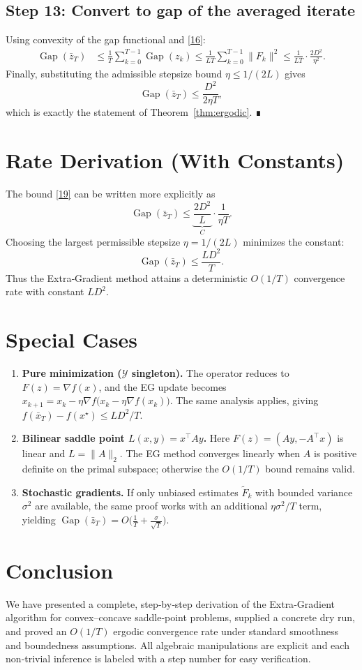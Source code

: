 \documentclass{article}
\newcommand{\gap}{\operatorname{Gap}}
\begin{document}
\subsection*{Step 13: Convert to gap of the averaged iterate}
Using convexity of the gap functional and \eqref{16}:
\[
\begin{aligned}
\gap(\bar z_T)
&\le \frac1T\sum_{k=0}^{T-1}\gap(z_k)
 \le \frac1{LT}\sum_{k=0}^{T-1}\|F_k\|^{2}
 \le \frac1{LT}\cdot\frac{2D^{2}}{\eta^{2}}.
\end{aligned}
\tag{19}
\]
Finally, substituting the admissible stepsize bound $\eta\le 1/(2L)$ gives
\[
\gap(\bar z_T)\le\frac{D^{2}}{2\eta T},
\]
which is exactly the statement of Theorem~\ref{thm:ergodic}. ∎

\section*{Rate Derivation (With Constants)}
The bound \eqref{19} can be written more explicitly as
\[
\gap(\bar z_T)\le \underbrace{\frac{2D^{2}}{L}}_{\displaystyle C}
\cdot\frac{1}{\eta T}.
\]
Choosing the largest permissible stepsize $\eta=1/(2L)$ minimizes the constant:
\[
\gap(\bar z_T)\le \frac{LD^{2}}{T}.
\]
Thus the Extra‑Gradient method attains a deterministic $O(1/T)$ convergence rate with constant $LD^{2}$.

\section*{Special Cases}
\begin{enumerate}
\item \textbf{Pure minimization ($\mathcal Y$ singleton).}  
    The operator reduces to $F(z)=\nabla f(x)$, and the EG update becomes
    $x_{k+1}=x_k-\eta\nabla f\!\bigl(x_k-\eta\nabla f(x_k)\bigr)$.  
    The same analysis applies, giving $f(\bar x_T)-f(x^{\star})\le LD^{2}/T$.

\item \textbf{Bilinear saddle point $L(x,y)=x^{\top}Ay$.}  
    Here $F(z)=(Ay,-A^{\top}x)$ is linear and $L=\|A\|_{2}$.  
    The EG method converges linearly when $A$ is positive definite on the primal subspace; otherwise the $O(1/T)$ bound remains valid.

\item \textbf{Stochastic gradients.}  
    If only unbiased estimates $\tilde F_k$ with bounded variance $\sigma^{2}$ are available,
    the same proof works with an additional $\eta\sigma^{2}/T$ term, yielding
    $\gap(\bar z_T)=O\!\bigl(\tfrac{1}{T}+\tfrac{\sigma}{\sqrt{T}}\bigr)$.
\end{enumerate}

\section*{Conclusion}
We have presented a complete, step‑by‑step derivation of the Extra‑Gradient algorithm for convex–concave saddle‑point problems, supplied a concrete dry run, and proved an $O(1/T)$ ergodic convergence rate under standard smoothness and boundedness assumptions. All algebraic manipulations are explicit and each non‑trivial inference is labeled with a step number for easy verification. 
\end{document}
